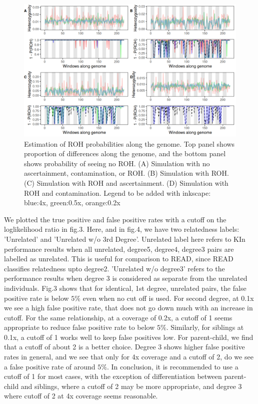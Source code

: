 \documentclass[12pt, letterpaper]{article}
\begin{document}
\begin{figure}[h]
    \centering
    \includegraphics[width=18cm]{plots/plotimg/ROHplot.png}
    \caption{Estimation of ROH probabilities along the genome. Top panel shows proportion of differences along the genome, and the bottom panel shows probability of seeing no ROH. (A) Simulation with no ascertainment, contamination, or ROH. (B) Simulation with ROH. (C) Simulation with ROH and ascertainment. (D) Simulation with ROH and contamination. Legend to be added with inkscape: blue:4x, green:0.5x, orange:0.2x}
    \label{fig:galaxy}
\end{figure}


We plotted the true positive and false positive rates with a cutoff on the loglikelihood ratio in fig.3. Here, and in fig.4, we have two relatedness labels: 'Unrelated' and 'Unrelated w/o 3rd Degree'. Unrelated label here refers to KIn performance results when all unrelated, degree5, degree4, degree3 pairs are labelled as unrelated. This is useful for comparison to READ, since READ classifies relatedness upto degree2. 'Unrelated w/o degree3'  refers to the performance results when degree 3 is considered as separate from the unrelated individuals. Fig.3 shows that for identical, 1st degree, unrelated pairs, the false positive rate is below $5\%$ even when no cut off is used. For second degree, at 0.1x we see a high false positive rate, that does not go down much with an increase in cutoff. For the same relationship, at a coverage of 0.2x, a cutoff of 1 seems appropriate to reduce false positive rate to below $5\%$. Similarly, for siblings at 0.1x, a cutoff of 1 works well to keep false positives low. For parent-child, we find that a cutoff of about 2 is a better choice. Degree 3 shows higher false positive rates in general, and we see that only for 4x coverage and a cutoff of 2, do we see a false positive rate of around $5\%$. In conclusion, it is recommended to use a cutoff of 1 for most cases, with the exception of differentiation between parent-child and siblings, where a cutoff of 2 may be more appropriate, and degree 3 where cutoff of 2 at 4x coverage seems reasonable. 
\end{document}
